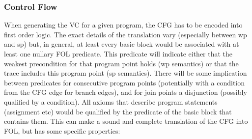 	\subsubsection{Control Flow}
When generating the VC for a given program, the CFG has to be encoded into first order logic.
The exact details of the translation vary (especially between wp and sp) but, in general, at least every basic block would be associated with at least one nullary FOL predicate.
This predicate will indicate either that the weakest precondition for that program point holds (wp semantics) or that the trace includes this program point (sp semantics).
There will be some implication between predicates for consecutive program points (potentially with a condition from the CFG edge for branch edges), and for join points a disjunction (possibly qualified by a condition).
All axioms that describe program statements (assignment etc) would be qualified by the predicate of the basic block that contains them.
This can make a sound and complete translation of the CFG into FOL, but has some specific properties:
